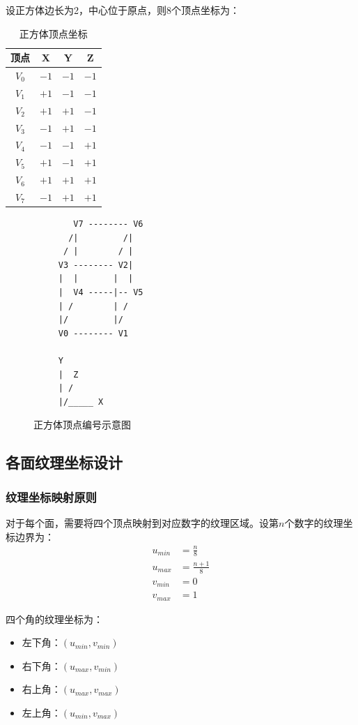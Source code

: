 \documentclass[12pt,a4paper]{article}
\begin{document}
设正方体边长为2，中心位于原点，则8个顶点坐标为：

\begin{table}[H]
\centering
\caption{正方体顶点坐标}
\begin{tabular}{|c|c|c|c|}
\hline
\textbf{顶点} & \textbf{X} & \textbf{Y} & \textbf{Z} \\
\hline
$V_0$ & $-1$ & $-1$ & $-1$ \\
$V_1$ & $+1$ & $-1$ & $-1$ \\
$V_2$ & $+1$ & $+1$ & $-1$ \\
$V_3$ & $-1$ & $+1$ & $-1$ \\
$V_4$ & $-1$ & $-1$ & $+1$ \\
$V_5$ & $+1$ & $-1$ & $+1$ \\
$V_6$ & $+1$ & $+1$ & $+1$ \\
$V_7$ & $-1$ & $+1$ & $+1$ \\
\hline
\end{tabular}
\end{table}

\begin{figure}[H]
\centering
\begin{verbatim}
        V7 -------- V6
       /|         /|
      / |        / |
     V3 -------- V2|
     |  |       |  |
     |  V4 -----|-- V5
     | /        | /
     |/         |/
     V0 -------- V1
     
     Y
     |  Z
     | /
     |/_____ X
\end{verbatim}
\caption{正方体顶点编号示意图}
\end{figure}

\subsection{各面纹理坐标设计}

\subsubsection{纹理坐标映射原则}

对于每个面，需要将四个顶点映射到对应数字的纹理区域。设第$n$个数字的纹理坐标边界为：
\begin{align}
u_{min} &= \frac{n}{8} \\
u_{max} &= \frac{n+1}{8} \\
v_{min} &= 0 \\
v_{max} &= 1
\end{align}

四个角的纹理坐标为：
\begin{itemize}
    \item 左下角：$(u_{min}, v_{min})$
    \item 右下角：$(u_{max}, v_{min})$
    \item 右上角：$(u_{max}, v_{max})$
    \item 左上角：$(u_{min}, v_{max})$
\end{itemize}
\end{document}
